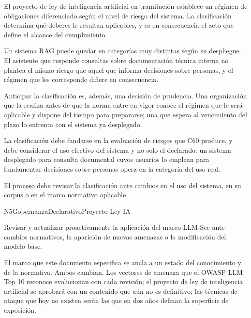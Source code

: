 El proyecto de ley de inteligencia artificial en tramitación establece un régimen de obligaciones diferenciado según el nivel de riesgo del sistema. La clasificación determina qué deberes le resultan aplicables, y es en consecuencia el acto que define el alcance del cumplimiento.

Un sistema RAG puede quedar en categorías muy distintas según su despliegue. El asistente que responde consultas sobre documentación técnica interna no plantea el mismo riesgo que aquel que informa decisiones sobre personas, y el régimen que les corresponde difiere en consecuencia.

Anticipar la clasificación es, además, una decisión de prudencia. Una organización que la realiza antes de que la norma entre en vigor conoce el régimen que le será aplicable y dispone del tiempo para prepararse; una que espera al vencimiento del plazo lo enfrenta con el sistema ya desplegado.

La clasificación debe fundarse en la evaluación de riesgos que C60 produce, y debe considerar el uso efectivo del sistema y no solo el declarado: un sistema desplegado para consulta documental cuyos usuarios lo emplean para fundamentar decisiones sobre personas opera en la categoría del uso real.

El proceso debe revisar la clasificación ante cambios en el uso del sistema, en su corpus o en el marco normativo aplicable.


  {N5}{Gobernanza}{Declarativo}{Proyecto Ley IA}

Revisar y actualizar proactivamente la aplicación del marco LLM-Sec ante cambios normativos, la aparición de nuevas amenazas o la modificación del modelo base.

El marco que este documento especifica se ancla a un estado del conocimiento y de la normativa. Ambos cambian. Los vectores de amenaza que el OWASP LLM Top 10 reconoce evolucionan con cada revisión; el proyecto de ley de inteligencia artificial se aprobará con un contenido que aún no es definitivo; las técnicas de ataque que hoy no existen serán las que en dos años definan la superficie de exposición.


